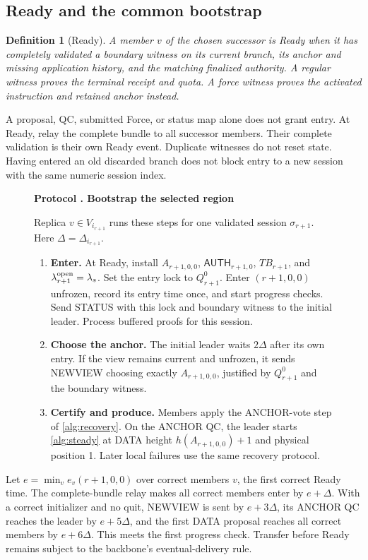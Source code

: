 \documentclass[11pt,a4paper]{article}
\newif\ifrevmarks
\newcommand{\Rv}[1]{\ifrevmarks\leavevmode{\color{rvBlue}#1}\else#1\fi}
\newcommand{\Cid}[1]{\ifrevmarks\textsuperscript{\hyperlink{chg:#1}{\color{rvBlue}\sffamily\scriptsize#1}}\fi}
\newcommand{\TB}{\mathit{TB}}
\newcommand{\tagg}[1]{\ensuremath{\mathsf{#1}}}
\newtheorem{definition}{Definition}[section]
\newcounter{protocol}
\newenvironment{protocol}[2]{\begin{figure}[htbp]\refstepcounter{protocol}\label{#1}
\begin{mdframed}[linewidth=.6pt,skipabove=0pt,skipbelow=0pt,
innertopmargin=7pt,innerbottommargin=7pt]\small
\textbf{Protocol \theprotocol. #2}\par\smallskip}{\end{mdframed}\end{figure}}
\begin{document}
\subsection{Ready and the common bootstrap}
\label{sec:ready}
\begin{definition}[Ready]
\label{def:ready}
A member $v$ of the chosen successor is Ready when it has completely
validated \Rv{a boundary witness on its current branch}, its
anchor and missing application history, and the matching finalized
authority.
A regular witness proves the terminal receipt and quota. A force
witness proves the activated instruction and retained anchor instead.
\end{definition}
A proposal, QC, submitted Force, or status map alone does not grant entry.
At Ready, relay the complete bundle to all successor members. Their
complete validation is their own Ready event. Duplicate witnesses do
not reset state. Having entered an old discarded branch does not block
entry to a new \Rv{session} with the same numeric session index.

\begin{protocol}{alg:bootstrap}{Bootstrap the selected region}
Replica $v\in V_{i_{r+1}}$ runs these steps for one validated
\Rv{session $\sigma_{r+1}$}.
Here $\Delta=\Delta_{i_{r+1}}$.
\begin{enumerate}[label=\textbf{\arabic*)},itemsep=3pt]
\item \textbf{Enter.} At Ready, install $A_{r+1,0,0}$,
$\tagg{AUTH}_{r+1,0}$, $\TB_{r+1}$, and \Rv{$\lambda^{\rm
open}_{r+1}=\lambda_s$}. Set the entry lock
to $Q^0_{r+1}$. Enter $(r+1,0,0)$ unfrozen, record its entry time once,
and start progress checks. Send STATUS with this lock and boundary
witness to the initial leader. Process buffered proofs for this \Rv{session}.
\item \textbf{Choose the anchor.} The initial leader waits $2\Delta$
after its own entry. If the view remains current and unfrozen, it sends
NEWVIEW choosing exactly $A_{r+1,0,0}$, justified by $Q^0_{r+1}$ and
the boundary witness.
\item \textbf{Certify and produce.} Members apply the ANCHOR-vote step
of \cref{alg:recovery}. On the ANCHOR QC, the leader starts
\cref{alg:steady} at DATA height $h(A_{r+1,0,0})+1$ and physical
position 1. Later local failures use the same recovery protocol.
\end{enumerate}
\end{protocol}

Let \Rv{$e=\min_v e_v(r+1,0,0)$ over correct members $v$, the}
first correct Ready time. The complete-bundle relay makes
all correct members enter by $e+\Delta$. With a correct initializer and
no quit, NEWVIEW is sent by $e+3\Delta$, its ANCHOR QC reaches the
leader by $e+5\Delta$, and the first DATA proposal reaches all correct
members by $e+6\Delta$. This meets the first progress check. Transfer
before Ready remains subject to the backbone's eventual-delivery rule.
\end{document}
